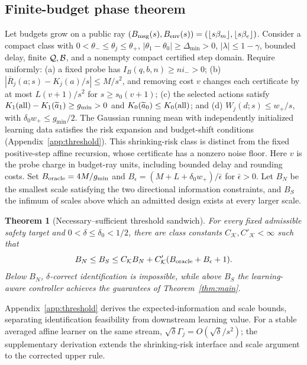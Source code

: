 \documentclass[journal]{IEEEtran}
\newtheorem{theorem}{Theorem}
\begin{document}
\subsection{Finite-budget phase theorem}
Let budgets grow on a public ray $(B_{\rm msg}(s),B_{\rm env}(s))=(\lfloor s\beta_m\rfloor,\lfloor s\beta_e\rfloor)$.
Consider a compact class with $0<\theta_-\le\theta_j\le\theta_+$, $|\theta_1-\theta_0|\ge\Delta_{\min}>0$, $|\lambda|\le1-\gamma$, bounded delay, finite ${\cal Q},{\cal B}$, and a nonempty compact certified step domain.
Require uniformly: (a) a fixed probe has $I_B(q,b,n)\ge ni_->0$; (b) $|\overline R_j(a;s)-K_j(a)/s|\le M/s^2$, and removing cost $v$ changes each certificate by at most $L(v+1)/s^2$ for $s\ge s_0(v+1)$; (c) the selected actions satisfy $K_1({\rm all})-K_1(\widetilde a_1)\ge g_{\min}>0$ and $K_0(\widetilde a_0)\le K_0({\rm all})$; and (d) $W_j(d;s)\le w_+/s$, with $\delta_0w_+\le g_{\min}/2$.
The Gaussian running mean with independently initialized learning data satisfies the risk expansion and budget-shift conditions (Appendix~\ref{app:threshold}).
This shrinking-risk class is distinct from the fixed positive-step affine recursion, whose certificate has a nonzero noise floor.
Here $v$ is the probe charge in budget-ray units, including bounded delay and rounding costs.
Set $B_{\rm oracle}=4M/g_{\min}$ and $B_\epsilon=(M+L+\delta_0w_+)/\bar\epsilon$ for $\bar\epsilon>0$.
Let $B_N$ be the smallest scale satisfying the two directional information constraints, and $B_S$ the infimum of scales above which an admitted design exists at every larger scale.

\begin{theorem}[Necessary--sufficient threshold sandwich]
For every fixed admissible safety target and $0<\delta\le\delta_0<1/2$, there are class constants $C_{\mathcal K},C'_{\mathcal K}<\infty$ such that
\begin{equation}
B_N\le B_S\le C_{\mathcal K}B_N+C'_{\mathcal K}(B_{\rm oracle}+B_\epsilon+1).
\label{eq:threshold-sandwich}
\end{equation}
Below $B_N$, $\delta$-correct identification is impossible, while above $B_S$ the learning-aware controller achieves the guarantees of Theorem~\ref{thm:main}.
\label{thm:sandwich}
\end{theorem}
Appendix~\ref{app:threshold} derives the expected-information and scale bounds, separating identification feasibility from downstream learning value.
For a stable averaged affine learner on the same stream, $\sqrt\delta\Gamma_j=O(\sqrt\delta/s^2)$; the supplementary derivation extends the shrinking-risk interface and scale argument to the corrected upper rule.
\end{document}
